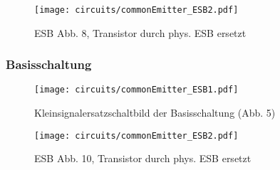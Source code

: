 \begin{figure}[H]
  \begin{center}
   \texttt{[image: circuits/commonEmitter\_ESB2.pdf]}
  \end{center}
  \caption{ESB Abb. 8, Transistor durch phys. ESB ersetzt}
\end{figure}


\subsubsection{Basisschaltung}
\begin{figure}[H]
  \begin{center}
    \texttt{[image: circuits/commonEmitter\_ESB1.pdf]}
  \end{center}
  \caption{Kleinsignalersatzschaltbild der Basisschaltung (Abb. 5)}
\end{figure}

\begin{figure}[H]
  \begin{center}
    \texttt{[image: circuits/commonEmitter\_ESB2.pdf]}
  \end{center}
  \caption{ESB Abb. 10, Transistor durch phys. ESB ersetzt}
\end{figure}


